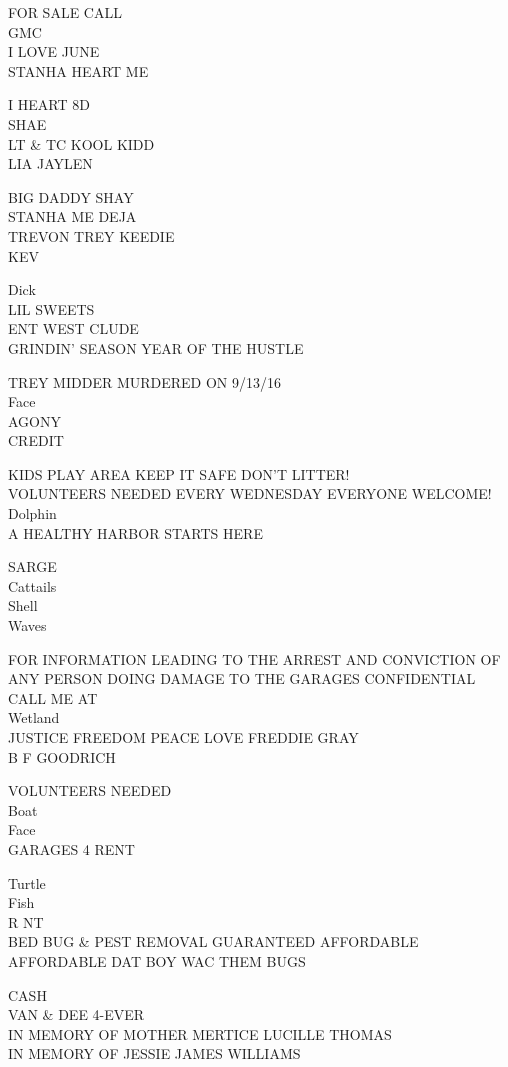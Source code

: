\documentclass[10pt,letterpaper]{article}
\begin{document}
FOR SALE CALL\\
GMC\\
I LOVE JUNE\\
STANHA HEART ME

I HEART 8D\\
SHAE\\
LT \& TC KOOL KIDD\\
LIA JAYLEN

BIG DADDY SHAY\\
STANHA ME DEJA\\
TREVON TREY KEEDIE\\
KEV

Dick\\
LIL SWEETS\\
ENT WEST CLUDE\\
GRINDIN' SEASON YEAR OF THE HUSTLE

TREY MIDDER MURDERED ON 9/13/16\\
Face\\
AGONY\\
CREDIT

KIDS PLAY AREA KEEP IT SAFE DON'T LITTER!\\
VOLUNTEERS NEEDED EVERY WEDNESDAY EVERYONE WELCOME!\\
Dolphin\\
A HEALTHY HARBOR STARTS HERE

SARGE\\
Cattails\\
Shell\\
Waves

FOR INFORMATION LEADING TO THE ARREST AND CONVICTION OF ANY PERSON DOING DAMAGE TO THE GARAGES CONFIDENTIAL CALL ME AT\\
Wetland\\
JUSTICE FREEDOM PEACE LOVE FREDDIE GRAY\\
B F GOODRICH

VOLUNTEERS NEEDED\\
Boat\\
Face\\
GARAGES 4 RENT

Turtle\\
Fish\\
R NT\\
BED BUG \& PEST REMOVAL GUARANTEED AFFORDABLE AFFORDABLE DAT BOY WAC THEM BUGS

CASH\\
VAN \& DEE 4{-}EVER\\
IN MEMORY OF MOTHER MERTICE LUCILLE THOMAS\\
IN MEMORY OF JESSIE JAMES WILLIAMS
\end{document}
